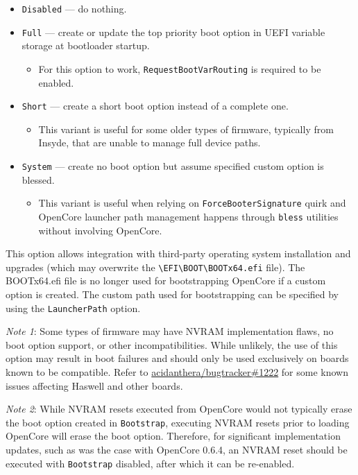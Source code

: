 \documentclass[]{article}
\providecommand{\tightlist}{%
  \setlength{\itemsep}{0pt}\setlength{\parskip}{0pt}}
\begin{document}
\begin{enumerate}
  \begin{itemize}
  \tightlist
  \item \texttt{Disabled} --- do nothing.
  \item \texttt{Full} --- create or update the top priority
  boot option in UEFI variable storage at bootloader startup.
  \begin{itemize}
  \tightlist
    \item For this option to work, \texttt{RequestBootVarRouting} is required to be enabled.
  \end{itemize}
  \item \texttt{Short} --- create a short boot option instead of a complete one.
  \begin{itemize}
  \tightlist
    \item This variant is useful for some older types of firmware, typically from Insyde,
    that are unable to manage full device paths.
  \end{itemize}
  \item \texttt{System} --- create no boot option but assume specified custom option is blessed.
    \begin{itemize}
  \tightlist
    \item This variant is useful when relying on \texttt{ForceBooterSignature} quirk and
    OpenCore launcher path management happens through \texttt{bless} utilities without
    involving OpenCore.
  \end{itemize} \medskip
  \end{itemize}

  This option allows integration with third-party operating system installation and upgrades
  (which may overwrite the \texttt{\textbackslash EFI\textbackslash BOOT\textbackslash BOOTx64.efi}
  file). The BOOTx64.efi file is no longer used for bootstrapping OpenCore if a custom option is created.
  The custom path used for bootstrapping can be specified by using the \texttt{LauncherPath} option.

  \emph{Note 1}: Some types of firmware may have NVRAM implementation flaws, no boot option
  support, or other incompatibilities. While unlikely, the use of this option may result in
  boot failures and should only be used exclusively on boards known to be compatible. Refer to
  \href{https://github.com/acidanthera/bugtracker/issues/1222}{acidanthera/bugtracker\#1222}
  for some known issues affecting Haswell and other boards.

  \emph{Note 2}: While NVRAM resets executed from OpenCore would not typically erase the boot option
  created in \texttt{Bootstrap}, executing NVRAM resets prior to loading OpenCore will erase the boot
  option. Therefore, for significant implementation updates, such as was the case with OpenCore 0.6.4,
  an NVRAM reset should be executed with \texttt{Bootstrap} disabled, after which it can be re-enabled.


\end{enumerate}
\end{document}
